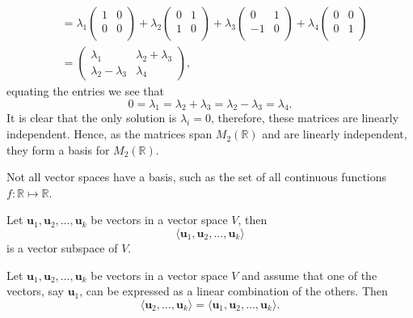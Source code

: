 \begin{example}
\begin{align*}
        &= \lambda_1
        \begin{pmatrix}
            1 & 0 \\
            0 & 0 \\
        \end{pmatrix}
        + \lambda_2 
        \begin{pmatrix}
            0 & 1 \\
            1 & 0 \\
        \end{pmatrix}
        + \lambda_3
        \begin{pmatrix}
            0 & 1 \\
            -1 & 0 \\
        \end{pmatrix}
        + \lambda_4
        \begin{pmatrix}
            0 & 0 \\
            0 & 1 \\
        \end{pmatrix}
        \\
        &=
        \begin{pmatrix}
            \lambda_1 & \lambda_2 + \lambda_3 \\
            \lambda_2 - \lambda_3 & \lambda_4
        \end{pmatrix}
        ,
    \end{align*}
    equating the entries we see that \[0 = \lambda_1 = \lambda_2 + \lambda_3 = \lambda_2 - \lambda_3 = \lambda_4.\] It is clear that the only solution is $\lambda_i = 0$, therefore, these matrices are linearly independent. Hence, as the matrices span $M_2(\mathbb{R})$ and are linearly independent, they form a basis for $M_2(\mathbb{R})$.
\end{example}

\begin{remark}
    Not all vector spaces have a basis, such as the set of all continuous functions $f : \mathbb{R} \mapsto \mathbb{R}$.
\end{remark}

\begin{lemma}
    Let $\bm{u}_1, \bm{u}_2, \ldots, \bm{u}_k$ be vectors in a vector space $V$, then \[\langle \bm{u}_1, \bm{u}_2, \ldots, \bm{u}_k \rangle\] is a vector subspace of $V$.
\end{lemma}

\begin{lemma}
    Let $\bm{u}_1, \bm{u}_2, \ldots, \bm{u}_k$ be vectors in a vector space $V$ and assume that one of the vectors, say $\bm{u}_1$, can be expressed as a linear combination of the others. Then \[\langle \bm{u}_2, \ldots, \bm{u}_k \rangle = \langle \bm{u}_1, \bm{u}_2, \ldots, \bm{u}_k \rangle.\]
\end{lemma}

